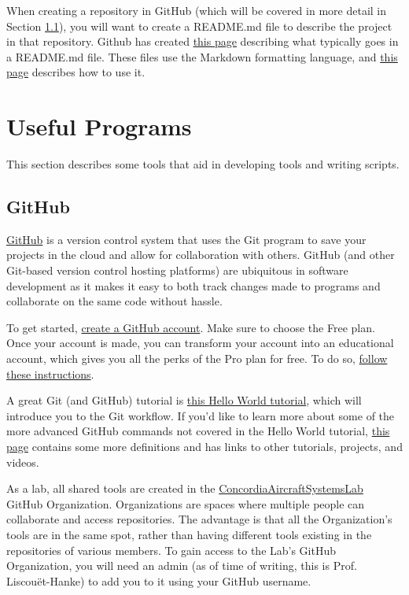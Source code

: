 \documentclass[letterpaper, 12pt]{article}
\begin{document}
When creating a repository in GitHub (which will be covered in more detail in Section \ref{github}), you will want to create a README.md file to describe the project in that repository. Github has created \href{https://help.github.com/en/github/creating-cloning-and-archiving-repositories/about-readmes}{this page} describing what typically goes in a README.md file. These files use the Markdown formatting language, and \href{https://help.github.com/en/github/writing-on-github/basic-writing-and-formatting-syntax}{this page} describes how to use it.

\section{Useful Programs}
This section describes some tools that aid in developing tools and writing scripts.
\subsection{GitHub}\label{github}
\href{https://github.com/}{GitHub} is a version control system that uses the Git program to save your projects in the cloud and allow for collaboration with others. GitHub (and other Git-based version control hosting platforms) are ubiquitous in software development as it makes it easy to both track changes made to programs and collaborate on the same code without hassle.

To get started, \href{https://github.com/join}{create a GitHub account}. Make sure to choose the Free plan. Once your account is made, you can transform your account into an educational account, which gives you all the perks of the Pro plan for free. To do so, \href{https://help.github.com/en/github/teaching-and-learning-with-github-education/applying-for-a-student-developer-pack}{follow these instructions}.

A great Git (and GitHub) tutorial is \href{https://guides.github.com/activities/hello-world/}{this Hello World tutorial}, which will introduce you to the Git workflow. If you'd like to learn more about some of the more advanced GitHub commands not covered in the Hello World tutorial, \href{https://guides.github.com/introduction/git-handbook/}{this page} contains some more definitions and has links to other tutorials, projects, and videos.

As a lab, all shared tools are created in the \href{https://github.com/ConcordiaAircraftSystemsLab}{ConcordiaAircraftSystemsLab} GitHub Organization. Organizations are spaces where multiple people can collaborate and access repositories. The advantage is that all the Organization's tools are in the same spot, rather than having different tools existing in the repositories of various members. To gain access to the Lab's GitHub Organization, you will need an admin (as of time of writing, this is Prof. Liscou{\"e}t-Hanke) to add you to it using your GitHub username.
\end{document}

